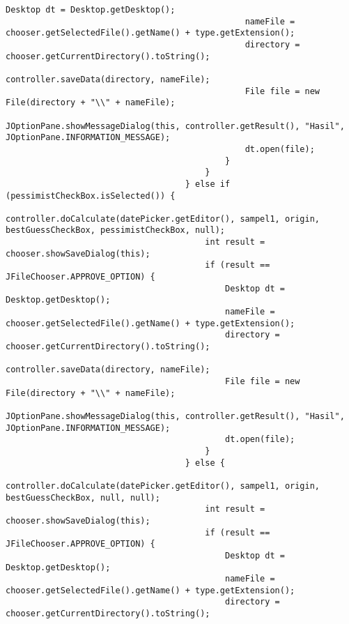\begin{lstlisting}[caption= main.java]
                                                Desktop dt = Desktop.getDesktop();
                                                nameFile = chooser.getSelectedFile().getName() + type.getExtension();
                                                directory = chooser.getCurrentDirectory().toString();
                                                controller.saveData(directory, nameFile);
                                                File file = new File(directory + "\\" + nameFile);
                                                JOptionPane.showMessageDialog(this, controller.getResult(), "Hasil", JOptionPane.INFORMATION_MESSAGE);
                                                dt.open(file);
                                            }
                                        }
                                    } else if (pessimistCheckBox.isSelected()) {
                                        controller.doCalculate(datePicker.getEditor(), sampel1, origin, bestGuessCheckBox, pessimistCheckBox, null);
                                        int result = chooser.showSaveDialog(this);
                                        if (result == JFileChooser.APPROVE_OPTION) {
                                            Desktop dt = Desktop.getDesktop();
                                            nameFile = chooser.getSelectedFile().getName() + type.getExtension();
                                            directory = chooser.getCurrentDirectory().toString();
                                            controller.saveData(directory, nameFile);
                                            File file = new File(directory + "\\" + nameFile);
                                            JOptionPane.showMessageDialog(this, controller.getResult(), "Hasil", JOptionPane.INFORMATION_MESSAGE);
                                            dt.open(file);
                                        }
                                    } else {
                                        controller.doCalculate(datePicker.getEditor(), sampel1, origin, bestGuessCheckBox, null, null);
                                        int result = chooser.showSaveDialog(this);
                                        if (result == JFileChooser.APPROVE_OPTION) {
                                            Desktop dt = Desktop.getDesktop();
                                            nameFile = chooser.getSelectedFile().getName() + type.getExtension();
                                            directory = chooser.getCurrentDirectory().toString();

\end{lstlisting}

